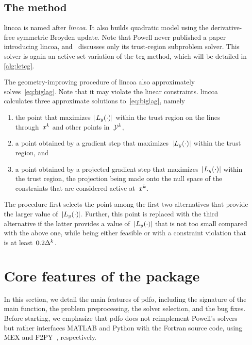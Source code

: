 \subsection{The  method}
\label{subsec:lincoa}

\Gls{lincoa} is named after \emph{\glsdesc{lincoa}}.
It also builds quadratic model using the derivative-free symmetric Broyden update.
Note that Powell never published a paper introducing \gls{lincoa}, and~\cite{Powell_2015} discusses only its trust-region subproblem solver.
This solver is again an active-set variation of the \gls{tcg} method, which will be detailed in \cref{alg:lctcg}.

The geometry-improving procedure of \gls{lincoa} also approximately solves~\cref{eq:biglag}.
Note that it may violate the linear constraints.
\Gls{lincoa} calculates three approximate solutions to~\cref{eq:biglag}, namely
\begin{enumerate}
    \item the point that maximizes~$\abs{\lagp[y](\cdot)}$ within the trust region on the lines through~$\iter[k]$ and other points in~$\xpt[k]$,
    \item a point obtained by a gradient step that maximizes~$\abs{\lagp[y](\cdot)}$ within the trust region, and
    \item a point obtained by a projected gradient step that maximizes~$\abs{\lagp[y](\cdot)}$ within the trust region, the projection being made onto the null space of the constraints that are considered active at~$\iter[k]$.
\end{enumerate}
The procedure first selects the point among the first two alternatives that provide the larger value of~$\abs{\lagp[y](\cdot)}$.
Further, this point is replaced with the third alternative if the latter provides a value of~$\abs{\lagp[y](\cdot)}$ that is not too small compared with the above one, while being either feasible or with a constraint violation that is at least~$0.2 \bar{\rad}^k$.

\section{Core features of the  package}
\label{sec:pdfo-core-features}

In this section, we detail the main features of \gls{pdfo}, including the signature of the main function, the problem preprocessing, the solver selection, and the bug fixes.
Before starting, we emphasize that \gls{pdfo} does not reimplement Powell's solvers but rather interfaces MATLAB and Python with the Fortran source code, using MEX and F2PY~\cite{Peterson_2009}, respectively.

